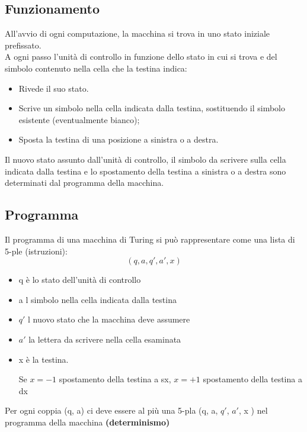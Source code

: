 \subsection{Funzionamento}
All'avvio di ogni computazione, la macchina si trova in uno stato iniziale prefissato.\\ A ogni passo l’unità di controllo in funzione dello stato in cui si trova e del simbolo contenuto nella cella che la testina indica:
\begin{itemize}
    \item Rivede il suo stato.
    
    \item Scrive un simbolo nella cella indicata dalla testina, sostituendo il simbolo esistente (eventualmente bianco);
    
    \item Sposta la testina di una posizione a sinistra o a destra.
\end{itemize}
Il nuovo stato assunto dall'unità di controllo, il simbolo da scrivere sulla cella indicata dalla testina e lo spostamento della testina a sinistra o a destra sono determinati dal programma della macchina.
\newpage
\subsection{Programma}
Il programma di una macchina di Turing si può rappresentare come una lista di 5-ple (istruzioni):\\
$$(q,a,q',a',x)$$
\begin{itemize}
    \item q è lo stato dell'unità di controllo
    \item a l simbolo nella cella indicata dalla testina
    \item $q'$ l nuovo stato che la macchina deve assumere
    \item $a'$ la lettera da scrivere nella cella esaminata
    \item x è la testina. 
    
    Se $x = -1$ spostamento della testina a sx, $x = +1$ spostamento della testina a dx
\end{itemize} 
Per ogni coppia (q, a) ci deve essere al più una 5-pla (q, a, $q'$, $a'$, x ) nel programma della macchina \textbf{(determinismo)}
